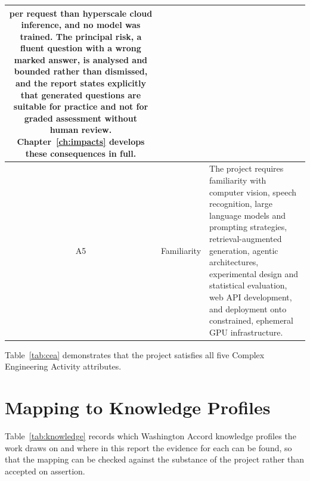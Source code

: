 {\begin{longtable}{|c|p{3.4cm}|p{8.4cm}|}
per request than hyperscale cloud inference, and no model was trained. The principal
risk, a fluent question with a wrong marked answer, is analysed and bounded
rather than dismissed, and the report states explicitly that generated questions are
suitable for practice and not for graded assessment without human review.
Chapter~\ref{ch:impacts} develops these consequences in full. \\
\hline
A5 & Familiarity &
The project requires familiarity with computer vision, speech recognition, large
language models and prompting strategies, retrieval-augmented generation, agentic
architectures, experimental design and statistical evaluation, web API development,
and deployment onto constrained, ephemeral GPU infrastructure. \\
\hline
\end{longtable}
}

Table~\ref{tab:cea} demonstrates that the project satisfies all five Complex
Engineering Activity attributes.

\section{Mapping to Knowledge Profiles}
\label{sec:cep-knowledge}

Table~\ref{tab:knowledge} records which Washington Accord knowledge profiles the work
draws on and where in this report the evidence for each can be found, so that the
mapping can be checked against the substance of the project rather than accepted on
assertion.

